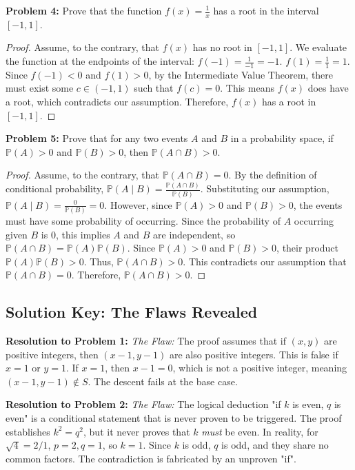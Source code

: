 \documentclass[11pt, letterpaper]{article}
\theoremstyle{remark}
\newcommand{\Prob}{\mathbb{P}}
\begin{document}
\textbf{Problem 4:} Prove that the function $f(x) = \frac{1}{x}$ has a root in the interval $[-1, 1]$.
\begin{proof}
Assume, to the contrary, that $f(x)$ has no root in $[-1, 1]$.
We evaluate the function at the endpoints of the interval:
$f(-1) = \frac{1}{-1} = -1$.
$f(1) = \frac{1}{1} = 1$.
Since $f(-1) < 0$ and $f(1) > 0$, by the Intermediate Value Theorem, there must exist some $c \in (-1, 1)$ such that $f(c) = 0$.
This means $f(x)$ does have a root, which contradicts our assumption.
Therefore, $f(x)$ has a root in $[-1, 1]$.
\end{proof}

\textbf{Problem 5:} Prove that for any two events $A$ and $B$ in a probability space, if $\Prob(A) > 0$ and $\Prob(B) > 0$, then $\Prob(A \cap B) > 0$.
\begin{proof}
Assume, to the contrary, that $\Prob(A \cap B) = 0$.
By the definition of conditional probability, $\Prob(A \mid B) = \frac{\Prob(A \cap B)}{\Prob(B)}$.
Substituting our assumption, $\Prob(A \mid B) = \frac{0}{\Prob(B)} = 0$.
However, since $\Prob(A) > 0$ and $\Prob(B) > 0$, the events must have some probability of occurring. Since the probability of $A$ occurring given $B$ is $0$, this implies $A$ and $B$ are independent, so $\Prob(A \cap B) = \Prob(A)\Prob(B)$.
Since $\Prob(A) > 0$ and $\Prob(B) > 0$, their product $\Prob(A)\Prob(B) > 0$.
Thus, $\Prob(A \cap B) > 0$. This contradicts our assumption that $\Prob(A \cap B) = 0$.
Therefore, $\Prob(A \cap B) > 0$.
\end{proof}

\newpage
\subsection{Solution Key: The Flaws Revealed}

\textbf{Resolution to Problem 1:}
\textit{The Flaw:} The proof assumes that if $(x, y)$ are positive integers, then $(x-1, y-1)$ are also positive integers. This is false if $x=1$ or $y=1$. If $x=1$, then $x-1=0$, which is not a positive integer, meaning $(x-1, y-1) \notin S$. The descent fails at the base case.

\textbf{Resolution to Problem 2:}
\textit{The Flaw:} The logical deduction "if $k$ is even, $q$ is even" is a conditional statement that is never proven to be triggered. The proof establishes $k^2 = q^2$, but it never proves that $k$ \textit{must} be even. In reality, for $\sqrt{4} = 2/1$, $p=2, q=1$, so $k=1$. Since $k$ is odd, $q$ is odd, and they share no common factors. The contradiction is fabricated by an unproven "if".
\end{document}
